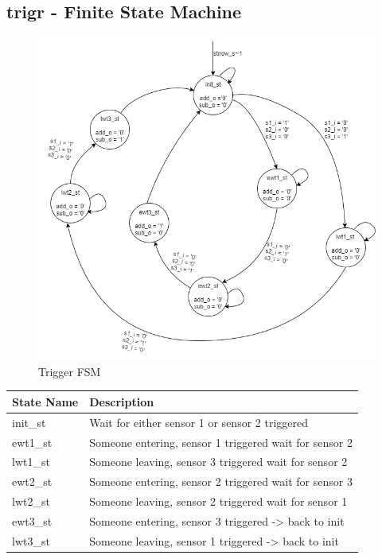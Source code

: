 \documentclass[12pt,a4 paper] {report}
\begin{document}
\subsection*{trigr - Finite State Machine}
\begin{figure}[h]
	\centering	
	\includegraphics[scale=0.4]{../png/trigger.png}
	\caption{Trigger FSM}
\end{figure}
\begin{center}
 \begin{tabular}{| p{4cm} | p{7cm} |}
	 \hline
	 \textbf{State Name} & \textbf{Description} \\
	 \hline
	 init\_st & Wait for either sensor 1 or sensor 2 triggered \\
	 \hline
	 ewt1\_st & Someone entering, sensor 1 triggered wait for sensor 2 \\
	 \hline
	 lwt1\_st & Someone leaving, sensor 3 triggered wait for sensor 2 \\
	 \hline
	 ewt2\_st & Someone entering, sensor 2 triggered wait for sensor 3 \\
	 \hline
	 lwt2\_st & Someone leaving, sensor 2 triggered wait for sensor 1 \\
	 \hline
	 ewt3\_st & Someone entering, sensor 3 triggered -> back to init \\
	 \hline
	 lwt3\_st & Someone leaving, sensor 1 triggered -> back to init \\
	 \hline
 \end{tabular}
\end{center}
\end{document}
